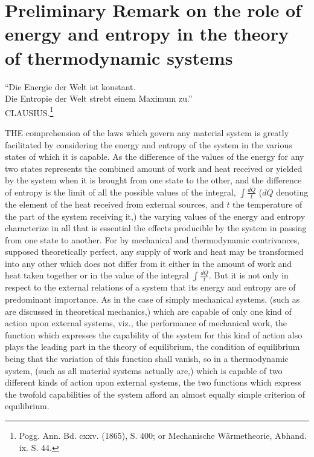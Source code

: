 \documentclass[12pt]{article}
\begin{document}


\tableofcontents
\section{Preliminary Remark on the role of energy and entropy in the theory of thermodynamic systems}
``Die Energie der Welt ist konstant. \\
Die Entropie der Welt strebt einem Maximum zu.'' \\
CLAUSIUS.\footnote{Pogg. Ann. Bd. cxxv. (1865), S. 400; or Mechanische W{\"a}rmetheorie, Abhand. ix. S. 44.}

THE comprehension of the laws which govern any material system is greatly facilitated by considering the energy and entropy of the system in the various states of which it is capable. As the difference of the values of the energy for any two states represents the combined amount of work and heat received or yielded by the system when it is brought from one state to the other, and the difference of entropy is the limit of all the possible values of the integral, $\int \frac{dQ}{t}$ ($dQ$ denoting the element of the heat received from external sources, and $t$ the temperature of the part of the system receiving it,) the varying values of the energy and entropy characterize in all that is essential the effects producible by the system in passing from one state to another. For by mechanical and thermodynamic contrivances, supposed theoretically perfect, any supply of work and heat may be transformed into any other which does not differ from it either in the amount of work and heat taken together or in the value of the integral $\int \frac{dQ}{t}$. But it is not only in respect to the external relations of a system that its energy and entropy are of predominant importance. As in the case of simply mechanical systems, (such as are discussed in theoretical mechanics,) which are capable of only one kind of action upon external systems, viz., the performance of mechanical work, the function which expresses the capability of the system for this kind of action also plays the leading part in the theory of equilibrium, the condition of equilibrium being that the variation of this function shall vanish, so in a thermodynamic system, (such as all material systems actually are,) which is capable of two different kinds of action upon external systems, the two functions which express the twofold capabilities of the system afford an almost equally simple criterion of equilibrium.
\end{document}
